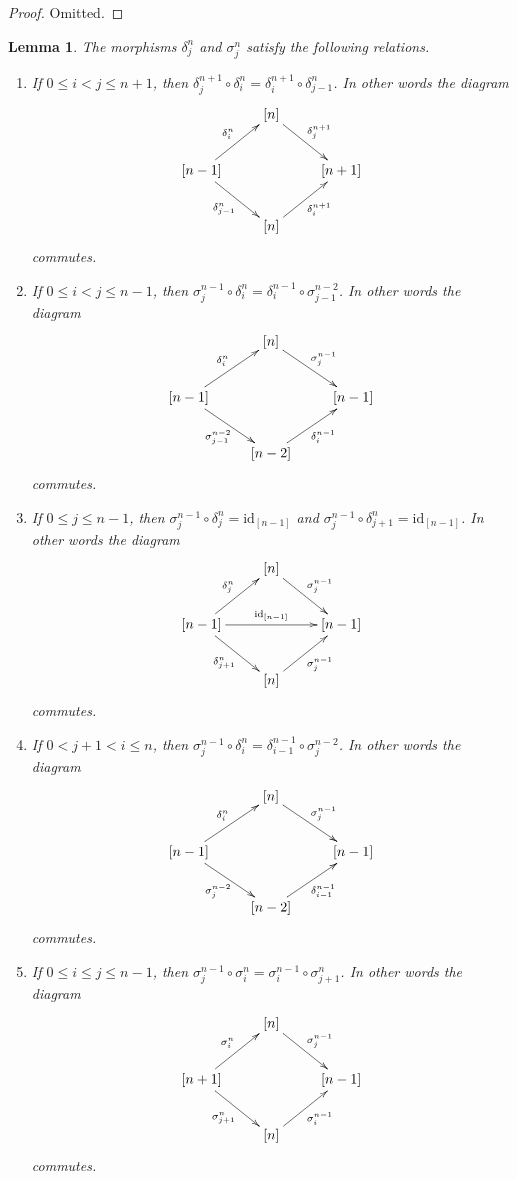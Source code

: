 \documentclass{stacks-project}
\theoremstyle{plain}
\newtheorem{lemma}[subsection]{Lemma}
\theoremstyle{definition}
\theoremstyle{remark}
\numberwithin{equation}{subsection}
\begin{document}
\begin{proof}
Omitted.
\end{proof}

\begin{lemma}
\label{lemma-relations-face-degeneracy}
The morphisms $\delta^n_j$ and $\sigma^n_j$ satisfy the following relations.
\begin{enumerate}
\item If $0 \leq i < j \leq n + 1$, then
$\delta^{n + 1}_j \circ \delta^n_i =
\delta^{n + 1}_i \circ \delta^n_{j - 1}$.
In other words the diagram
$$
\xymatrix{
& [n] \ar[rd]^{\delta^{n + 1}_j} & \\
[n - 1] \ar[ru]^{\delta^n_i} \ar[rd]_{\delta^n_{j - 1}} & &
[n + 1] \\
& [n] \ar[ru]_{\delta^{n + 1}_i} &
}
$$
commutes.
\item If $0 \leq i < j \leq n - 1$, then
$\sigma^{n - 1}_j \circ \delta^n_i =
\delta^{n - 1}_i \circ \sigma^{n - 2}_{j - 1}$.
In other words the diagram
$$
\xymatrix{
& [n] \ar[rd]^{\sigma^{n - 1}_j} & \\
[n - 1] \ar[ru]^{\delta^n_i} \ar[rd]_{\sigma^{n - 2}_{j - 1}} & &
[n - 1] \\
& [n - 2] \ar[ru]_{\delta^{n - 1}_i} &
}
$$
commutes.
\item If $0 \leq j \leq n - 1$, then
$\sigma^{n - 1}_j \circ \delta^n_j = \text{id}_{[n - 1]}$
and
$\sigma^{n - 1}_j \circ \delta^n_{j + 1} = \text{id}_{[n - 1]}$.
In other words the diagram
$$
\xymatrix{
& [n] \ar[rd]^{\sigma^{n - 1}_j} & \\
[n - 1]
\ar[ru]^{\delta^n_j}
\ar[rd]_{\delta^n_{j + 1}}
\ar[rr]^{\text{id}_{[n - 1]}} & & [n - 1] \\
& [n] \ar[ru]_{\sigma^{n - 1}_j} &
}
$$
commutes.
\item If $0 < j + 1 < i \leq n$, then
$\sigma^{n - 1}_j \circ \delta^n_i =
\delta^{n - 1}_{i - 1} \circ \sigma^{n - 2}_j$.
In other words the diagram
$$
\xymatrix{
& [n] \ar[rd]^{\sigma^{n - 1}_j} & \\
[n - 1] \ar[ru]^{\delta^n_i} \ar[rd]_{\sigma^{n - 2}_j} & &
[n - 1] \\
& [n - 2] \ar[ru]_{\delta^{n - 1}_{i - 1}} &
}
$$
commutes.
\item If $0 \leq i \leq j \leq n - 1$, then
$\sigma^{n - 1}_j \circ \sigma^n_i =
\sigma^{n - 1}_i \circ \sigma^n_{j + 1}$.
In other words the diagram
$$
\xymatrix{
& [n] \ar[rd]^{\sigma^{n - 1}_j} & \\
[n + 1] \ar[ru]^{\sigma^n_i} \ar[rd]_{\sigma^n_{j + 1}} & &
[n - 1] \\
& [n] \ar[ru]_{\sigma^{n - 1}_i} &
}
$$
commutes.
\end{enumerate}
\end{lemma}
\end{document}
